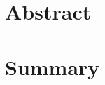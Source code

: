 
\clearpage
{}
\section*{Abstract}

\begin{center}
\begin{minipage}[t]{0.7\textwidth}
	\blindtext[1]
\end{minipage}
\end{center}

\vfill

\section*{Summary}

\begin{center}
\begin{minipage}[t]{0.7\textwidth}
	\blindtext[2]
\end{minipage}
\end{center}

\vfill

\thispagestyle{empty}